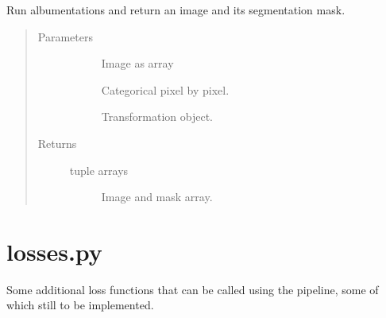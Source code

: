 \documentclass[letterpaper,10pt,english]{sphinxmanual}
\begin{document}
\begin{fulllineitems}
\label{\detokenize{index:pathflowai.datasets.segmentation_transform}}
Run albumentations and return an image and its segmentation mask.
\begin{quote}\begin{description}
\item[{Parameters}] \leavevmode\begin{description}
\item[{}] \leavevmode
Image as array

\item[{}] \leavevmode
Categorical pixel by pixel.

\item[{}] \leavevmode
Transformation object.

\end{description}

\item[{Returns}] \leavevmode\begin{description}
\item[{tuple arrays}] \leavevmode
Image and mask array.

\end{description}

\end{description}\end{quote}

\end{fulllineitems}

\label{\detokenize{index:module-pathflowai.losses}}

\chapter{losses.py}
\label{\detokenize{index:losses-py}}
Some additional loss functions that can be called using the pipeline, some of which still to be implemented.
\end{document}
